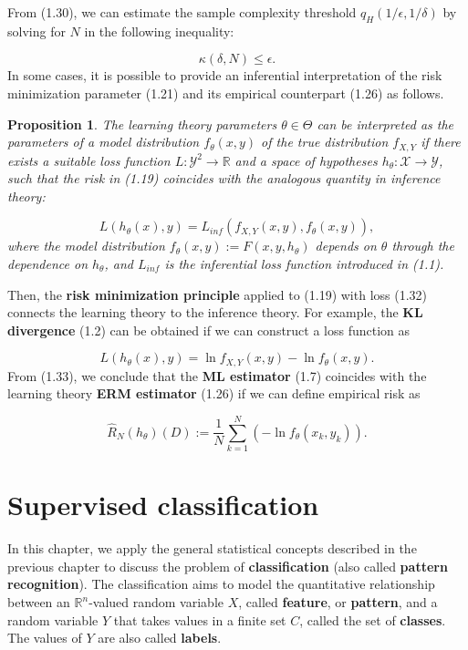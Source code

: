 \documentclass{report}
\newtheorem{proposition}{Proposition}[chapter]
\begin{document}
From (1.30), we can estimate the sample complexity threshold $q_H(1/\epsilon, 1/\delta)$ by solving for $N$ in the following inequality:

\begin{equation}
\kappa(\delta,N) \leq \epsilon.
\end{equation}
In some cases, it is possible to provide an inferential interpretation of the risk minimization parameter (1.21) and its empirical counterpart (1.26) as follows.

\begin{proposition}
The learning theory parameters $\theta \in \Theta$ can be interpreted as the parameters of a model distribution $f_\theta(x,y)$ of the true distribution $f_{X,Y}$ if there exists a suitable loss function $L : \mathcal{Y}^2 \to \mathbb{R}$ and a space of hypotheses $h_\theta: \mathcal{X} \to \mathcal{Y}$, such that the risk in (1.19) coincides with the analogous quantity in inference theory:

\begin{equation}
L(h_\theta(x), y) = L_{inf}(f_{X,Y}(x,y),f_\theta(x,y)),
\end{equation}
where the model distribution $f_\theta(x,y) := F(x,y,h_\theta)$ depends on $\theta$ through the dependence on $h_\theta$, and $L_{inf}$ is the inferential loss function introduced in (1.1).
\end{proposition}
Then, the \textbf{risk minimization principle} applied to (1.19) with loss (1.32) connects the learning theory to the inference theory. For example, the \textbf{KL divergence} (1.2) can be obtained if we can construct a loss function as

\begin{equation}
L(h_\theta(x), y) = \ln f_{X,Y}(x,y) -\ln f_\theta(x,y).
\end{equation}
From (1.33), we conclude that the \textbf{ML estimator} (1.7) coincides with the learning theory \textbf{ERM estimator} (1.26) if we can define empirical risk as

\begin{equation}
\hat{R}_N(h_\theta)(D) := \frac{1}{N}\sum_{k=1}^N (-\ln f_\theta(x_k,y_k)).
\end{equation}

\chapter{Supervised classification}
In this chapter, we apply the general statistical concepts described in the previous chapter to discuss the problem of \textbf{classification} (also called \textbf{pattern recognition}). The classification aims to model the quantitative relationship between an $\mathbb{R}^n$-valued random variable $X$, called \textbf{feature}, or \textbf{pattern}, and a random variable $Y$ that takes values in a finite set $C$, called the set of \textbf{classes}. The values of $Y$ are also called \textbf{labels}.
\end{document}
